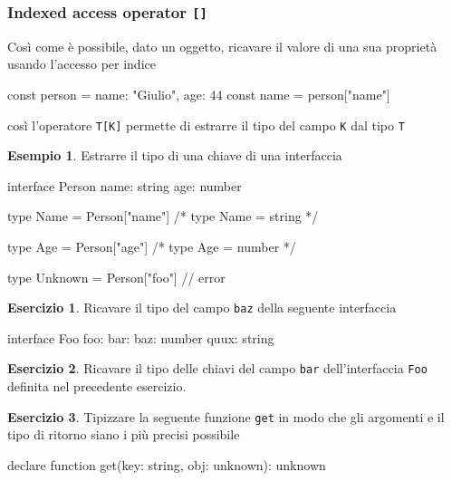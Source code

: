 \documentclass[12pt]{article}
\theoremstyle{definition}
\newtheorem{example}{Esempio}[subsection]
\newtheorem{exercise}{Esercizio}[subsection]
\newenvironment{code}
  {\vspace{0.5cm} \VerbatimEnvironment\begin{typescriptcode}}
  {\end{typescriptcode} \vspace{0.2cm}}
\begin{document}
\subsubsection{Indexed access operator \texttt{[]}}

Così come è possibile, dato un oggetto, ricavare il valore di una sua proprietà usando l'accesso per indice

\begin{code}
const person = { name: "Giulio", age: 44 }
const name = person["name"]
\end{code}

così l'operatore \texttt{T[K]} permette di estrarre il tipo del campo \texttt{K} dal tipo \texttt{T}

\begin{example}
Estrarre il tipo di una chiave di una interfaccia

\begin{code}
interface Person {
  name: string
  age: number
}

type Name = Person["name"]
/*
type Name = string
*/

type Age = Person["age"]
/*
type Age = number
*/

type Unknown = Person["foo"] // error
\end{code}
\end{example}

\begin{exercise}
Ricavare il tipo del campo \texttt{baz} della seguente interfaccia

\begin{code}
interface Foo {
  foo: {
    bar: {
      baz: number
      quux: string
    }
  }
}
\end{code}
\end{exercise}

\begin{exercise}
Ricavare il tipo delle chiavi del campo \texttt{bar} dell'interfaccia \texttt{Foo} definita nel precedente esercizio.
\end{exercise}

\begin{exercise}
Tipizzare la seguente funzione \texttt{get} in modo che gli argomenti e il tipo di ritorno siano i più precisi possibile

\begin{code}
declare function get(key: string, obj: unknown): unknown
\end{code}
\end{exercise}
\end{document}

